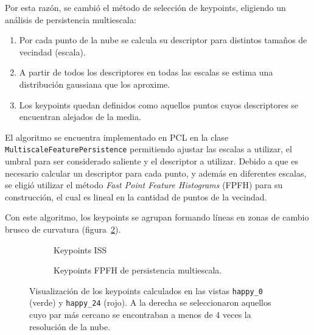 			Por esta razón, se cambió el método de selección de keypoints,
			eligiendo un análisis de persistencia multiescala:
			\begin{enumerate}
				\item Por cada punto de la nube se calcula su descriptor para distintos tamaños de vecindad (escala).
				\item A partir de todos los descriptores en todas las escalas se estima una distribución gaussiana que los aproxime.
				\item Los keypoints quedan definidos como aquellos puntos cuyos descriptores se encuentran alejados de la media\cite{Rusu:2009:FPF:1703435.1703733}.
			\end{enumerate}
			El algoritmo se encuentra implementado en PCL en la clase
			\texttt{Multiscale\-Feature\-Persistence} permitiendo ajustar las
			escalas a utilizar, el umbral para ser considerado saliente y el descriptor a utilizar.
			Debido a que es necesario calcular un descriptor para cada punto, y
			además en diferentes escalas, se eligió utilizar el método
			\emph{Fast Point Feature Histograms} (FPFH) para su construcción,
			el cual es lineal en la cantidad de puntos de la vecindad.

			Con este algoritmo, los keypoints se agrupan formando líneas en zonas de cambio brusco de curvatura (figura~\ref{fig:multiscale_key}).


			\begin{figure}
				\centering
				\begin{subfigure}{\linewidth}
					\caption{\label{fig:iss_key}Keypoints ISS}
				\end{subfigure}

				\begin{subfigure}{\linewidth}
					\caption{\label{fig:multiscale_key}Keypoints FPFH de persistencia multiescala.}
				\end{subfigure}
				\caption{\label{fig:keypoints}Visualización de los keypoints calculados en las vistas
					\texttt{happy\_0} (verde) y \texttt{happy\_24} (rojo).
					A la derecha se seleccionaron aquellos cuyo par
					más cercano se encontraban a menos de 4 veces la resolución
					de la nube.}
			\end{figure}



